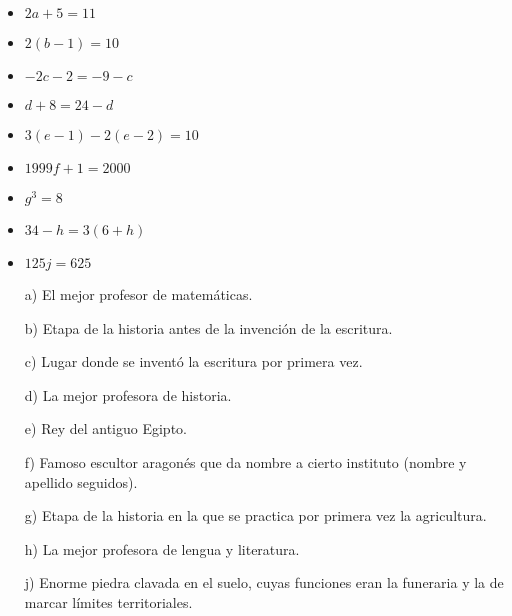 \documentclass[a4paper]{article}
\begin{document}
\begin{itemize}
	\item $2a+5=11$
	\item $2(b-1)=10$
	\item $-2c-2=-9-c$
	\item $d+8=24-d$
	\item $3(e-1)-2(e-2) = 10$
	\item $1999f + 1 = 2000$
	\item $g^3=8$
	\item $34-h = 3(6+h)$
	\item $125j=625$
\end{itemize}
\newpage
\centering{}

\vspace{2cm}
\begin{itemize}
	\item[a)] El mejor profesor de matemáticas.
	\item[b)] Etapa de la historia antes de la invención de la escritura.
	\item[c)] Lugar donde se inventó la escritura por primera vez.
	\item[d)] La mejor profesora de historia.
	\item[e)] Rey del antiguo Egipto.
	\item[f)] Famoso escultor aragonés que da nombre a cierto instituto (nombre y apellido seguidos).
	\item[g)] Etapa de la historia en la que se practica por primera vez la agricultura.
	\item[h)] La mejor profesora de lengua y literatura.
	\item[j)] Enorme piedra clavada en el suelo, cuyas funciones eran la funeraria y la de marcar límites territoriales.
\end{itemize}
\end{document}
